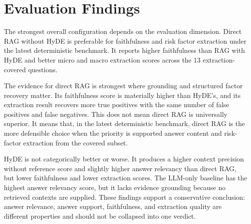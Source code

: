 \section{Evaluation Findings}

The strongest overall configuration depends on the evaluation dimension. Direct RAG without HyDE is preferable for faithfulness and risk factor extraction under the latest deterministic benchmark. It reports higher faithfulness than RAG with HyDE and better micro and macro extraction scores across the 13 extraction-covered questions.

The evidence for direct RAG is strongest where grounding and structured factor recovery matter. Its faithfulness score is materially higher than HyDE's, and its extraction result recovers more true positives with the same number of false positives and false negatives. This does not mean direct RAG is universally superior. It means that, in the latest deterministic benchmark, direct RAG is the more defensible choice when the priority is supported answer content and risk-factor extraction from the covered subset.

HyDE is not categorically better or worse. It produces a higher context precision without reference score and slightly higher answer relevancy than direct RAG, but lower faithfulness and lower extraction scores. The LLM-only baseline has the highest answer relevancy score, but it lacks evidence grounding because no retrieved contexts are supplied. These findings support a conservative conclusion: answer relevance, answer support, faithfulness, and extraction quality are different properties and should not be collapsed into one verdict.

